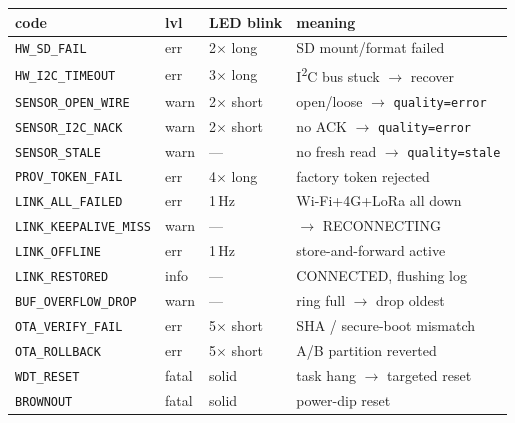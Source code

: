\begin{center}
\renewcommand{\arraystretch}{1.1}\footnotesize
\begin{tabularx}{\textwidth}{@{}l l l X@{}}
\toprule
\textbf{code} & \textbf{lvl} & \textbf{LED blink} & \textbf{meaning} \\
\midrule
\texttt{HW\_SD\_FAIL} & err & 2$\times$ long & SD mount/format failed \\
\texttt{HW\_I2C\_TIMEOUT} & err & 3$\times$ long & I\textsuperscript{2}C bus stuck $\to$ recover \\
\texttt{SENSOR\_OPEN\_WIRE} & warn & 2$\times$ short & open/loose $\to$ \texttt{quality=error} \\
\texttt{SENSOR\_I2C\_NACK} & warn & 2$\times$ short & no ACK $\to$ \texttt{quality=error} \\
\texttt{SENSOR\_STALE} & warn & --- & no fresh read $\to$ \texttt{quality=stale} \\
\texttt{PROV\_TOKEN\_FAIL} & err & 4$\times$ long & factory token rejected \\
\texttt{LINK\_ALL\_FAILED} & err & 1\,Hz & Wi-Fi+4G+LoRa all down \\
\texttt{LINK\_KEEPALIVE\_MISS} & warn & --- & $\to$ RECONNECTING \\
\texttt{LINK\_OFFLINE} & err & 1\,Hz & store-and-forward active \\
\texttt{LINK\_RESTORED} & info & --- & CONNECTED, flushing log \\
\texttt{BUF\_OVERFLOW\_DROP} & warn & --- & ring full $\to$ drop oldest \\
\texttt{OTA\_VERIFY\_FAIL} & err & 5$\times$ short & SHA / secure-boot mismatch \\
\texttt{OTA\_ROLLBACK} & err & 5$\times$ short & A/B partition reverted \\
\texttt{WDT\_RESET} & fatal & solid & task hang $\to$ targeted reset \\
\texttt{BROWNOUT} & fatal & solid & power-dip reset \\
\bottomrule
\end{tabularx}
\end{center}

